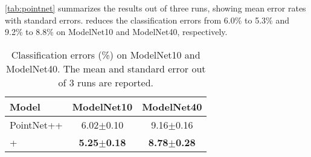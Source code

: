 \documentclass[final]{cvpr}
\begin{document}
\autoref{tab:pointnet} summarizes the results out of three runs, showing mean error rates with standard errors.  \methodname{} reduces the classification errors from 6.0\% to 5.3\% and 9.2\% to 8.8\% on ModelNet10 and ModelNet40, respectively. 


\begin{table}[h]
    \centering
    \begin{tabular}{l|c|c}
    \toprule
    Model & ModelNet10 & ModelNet40 \\
    \midrule
    \midrule
    PointNet++ & 6.02$\pm$0.10 & 9.16$\pm$0.16\\
    + \methodname{} & \textbf{5.25$\pm$0.18 }& \textbf{8.78$\pm$0.28}\\
    \bottomrule
\end{tabular}
\caption{Classification errors (\%) on ModelNet10 and ModelNet40. The mean and standard error out of 3 runs are reported.}
\label{tab:pointnet}     \vspace{-0.2in}
\end{table}









 






{\small


}

\clearpage
\appendix

\end{document}
